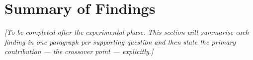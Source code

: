 \section{Summary of Findings}

\textit{[To be completed after the experimental phase. This section will summarise each
finding in one paragraph per supporting question and then state the primary contribution
--- the crossover point --- explicitly.]}
